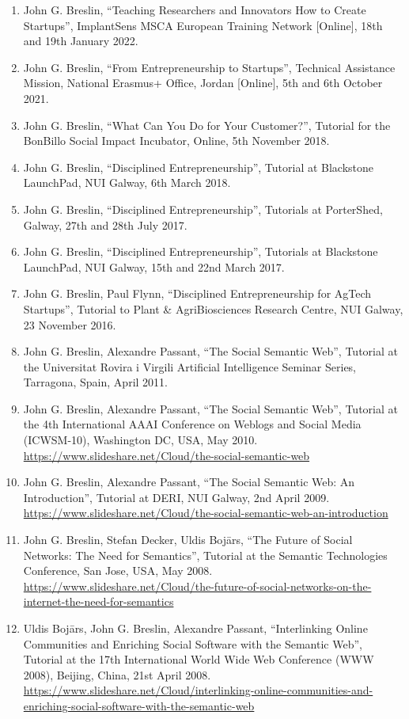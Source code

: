\documentclass[10pt,a4paper]{res} %
\begin{document}
\begin{resume}
\begin{enumerate} \itemsep -2pt
\item John G. Breslin, ``Teaching Researchers and Innovators How to Create Startups'', ImplantSens MSCA European Training Network [Online], 18th and 19th January 2022.
\item John G. Breslin, ``From Entrepreneurship to Startups'', Technical Assistance Mission, National Erasmus+ Office, Jordan [Online], 5th and 6th October 2021. %
\item John G. Breslin, ``What Can You Do for Your Customer?'', Tutorial for the BonBillo Social Impact Incubator, Online, 5th November 2018. %
\item John G. Breslin, ``Disciplined Entrepreneurship'', Tutorial at Blackstone LaunchPad, NUI Galway, 6th March 2018. %
\item John G. Breslin, ``Disciplined Entrepreneurship'', Tutorials at PorterShed, Galway, 27th and 28th July 2017. %
\item John G. Breslin, ``Disciplined Entrepreneurship'', Tutorials at Blackstone LaunchPad, NUI Galway, 15th and 22nd March 2017. %
\item John G. Breslin, Paul Flynn, ``Disciplined Entrepreneurship for AgTech Startups'', Tutorial to Plant \& AgriBiosciences Research Centre, NUI Galway, 23 November 2016. %
\item John G. Breslin, Alexandre Passant, ``The Social Semantic Web'', Tutorial at the Universitat Rovira i Virgili Artificial Intelligence Seminar Series, Tarragona, Spain, April 2011. %
\item John G. Breslin, Alexandre Passant, ``The Social Semantic Web'', Tutorial at the 4th International AAAI Conference on Weblogs and Social Media (ICWSM-10), Washington DC, USA, May 2010. \url{https://www.slideshare.net/Cloud/the-social-semantic-web}
\item John G. Breslin, Alexandre Passant, ``The Social Semantic Web: An Introduction'', Tutorial at DERI, NUI Galway, 2nd April 2009. \url{https://www.slideshare.net/Cloud/the-social-semantic-web-an-introduction}
\item John G. Breslin, Stefan Decker, Uldis Boj\={a}rs, ``The Future of Social Networks: The Need for Semantics'', Tutorial at the Semantic Technologies Conference, San Jose, USA, May 2008. \url{https://www.slideshare.net/Cloud/the-future-of-social-networks-on-the-internet-the-need-for-semantics}
\item Uldis Boj\={a}rs, John G. Breslin, Alexandre Passant, ``Interlinking Online Communities and Enriching Social Software with the Semantic Web'', Tutorial at the 17th International World Wide Web Conference (WWW 2008), Beijing, China, 21st April 2008. \url{https://www.slideshare.net/Cloud/interlinking-online-communities-and-enriching-social-software-with-the-semantic-web}

\end{enumerate}
\end{resume}
\end{document}
